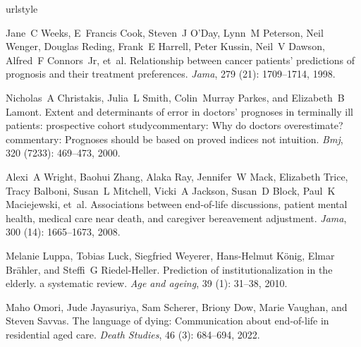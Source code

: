 \documentclass{article}
\begin{document}
\begin{thebibliography}{60}
\providecommand{\natexlab}[1]{#1}
\providecommand{\url}[1]{\texttt{#1}}
\expandafter\ifx\csname urlstyle\endcsname\relax
  \providecommand{\doi}[1]{doi: #1}\else
  \providecommand{\doi}{doi: \begingroup \urlstyle{rm}\Url}\fi

Jane~C Weeks, E~Francis Cook, Steven~J O'Day, Lynn~M Peterson, Neil Wenger,
  Douglas Reding, Frank~E Harrell, Peter Kussin, Neil~V Dawson, Alfred~F
  Connors~Jr, et~al.
\newblock Relationship between cancer patients' predictions of prognosis and
  their treatment preferences.
\newblock \emph{Jama}, 279 (21): 1709--1714, 1998.

Nicholas~A Christakis, Julia~L Smith, Colin~Murray Parkes, and Elizabeth~B
  Lamont.
\newblock Extent and determinants of error in doctors' prognoses in terminally
  ill patients: prospective cohort studycommentary: Why do doctors
  overestimate? commentary: Prognoses should be based on proved indices not
  intuition.
\newblock \emph{Bmj}, 320 (7233): 469--473, 2000.

Alexi~A Wright, Baohui Zhang, Alaka Ray, Jennifer~W Mack, Elizabeth Trice,
  Tracy Balboni, Susan~L Mitchell, Vicki~A Jackson, Susan~D Block, Paul~K
  Maciejewski, et~al.
\newblock Associations between end-of-life discussions, patient mental health,
  medical care near death, and caregiver bereavement adjustment.
\newblock \emph{Jama}, 300 (14): 1665--1673, 2008.

Melanie Luppa, Tobias Luck, Siegfried Weyerer, Hans-Helmut K{\"o}nig, Elmar
  Br{\"a}hler, and Steffi~G Riedel-Heller.
\newblock Prediction of institutionalization in the elderly. a systematic
  review.
\newblock \emph{Age and ageing}, 39 (1): 31--38, 2010.

Maho Omori, Jude Jayasuriya, Sam Scherer, Briony Dow, Marie Vaughan, and Steven
  Savvas.
\newblock The language of dying: Communication about end-of-life in residential
  aged care.
\newblock \emph{Death Studies}, 46 (3): 684--694, 2022.


\end{thebibliography}
\end{document}

